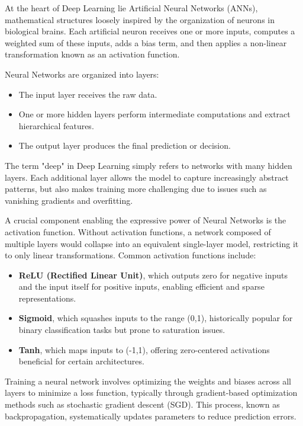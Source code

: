\documentclass{book}
\begin{document}
At the heart of Deep Learning lie Artificial Neural Networks (ANNs), 
mathematical structures loosely inspired by the organization of neurons in 
biological brains. Each artificial neuron receives one or more inputs, computes 
a weighted sum of these inputs, adds a bias term, and then applies a non-linear 
transformation known as an activation function.

Neural Networks are organized into layers:

\begin{itemize}
    \item The input layer receives the raw data.
    \item One or more hidden layers perform intermediate computations and 
    extract hierarchical features.
    \item The output layer produces the final prediction or decision.
\end{itemize}

The term "deep" in Deep Learning simply refers to networks with many hidden 
layers. Each additional layer allows the model to capture increasingly abstract 
patterns, but also makes training more challenging due to issues such as 
vanishing gradients and overfitting.

A crucial component enabling the expressive power of Neural Networks is the 
activation function. Without activation functions, a network composed of 
multiple layers would collapse into an equivalent single-layer model, 
restricting it to only linear transformations. Common activation functions 
include:

\begin{itemize}
    \item \textbf{ReLU (Rectified Linear Unit)}, which outputs zero for 
    negative inputs and the input itself for positive inputs, enabling efficient 
    and sparse representations.
    \item \textbf{Sigmoid}, which squashes inputs to the range (0,1), 
    historically popular for binary classification tasks but prone to saturation 
    issues.
    \item \textbf{Tanh}, which maps inputs to (-1,1), offering zero-centered 
    activations beneficial for certain architectures.
\end{itemize}

Training a neural network involves optimizing the weights and biases across all 
layers to minimize a loss function, typically through gradient-based 
optimization methods such as stochastic gradient descent (SGD). This process, 
known as backpropagation, systematically updates parameters to reduce prediction
errors.
\end{document}
